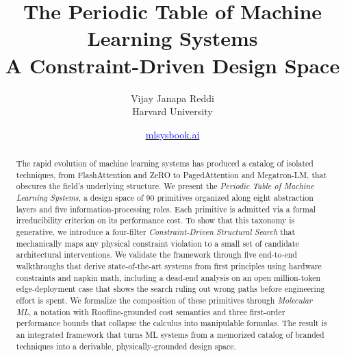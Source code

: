 \documentclass[10pt,twocolumn]{article}
\newcommand{\hrefurl}[2]{\href{#1}{\textcolor{blue}{#2}}}
\begin{document}
\title{
  \textbf{The Periodic Table of Machine Learning Systems}\\[0.3em]
  {\large A Constraint-Driven Design Space}
}

\author{
  Vijay Janapa Reddi\\
  Harvard University
}

\date{\hrefurl{https://mlsysbook.ai}{mlsysbook.ai}}

\maketitle
\begingroup
\renewcommand{\thefootnote}{}%
%
\endgroup

\begin{abstract}
The rapid evolution of machine learning systems has produced a catalog of isolated techniques, from FlashAttention and ZeRO to PagedAttention and Megatron-LM, that obscures the field's underlying structure. We present the \emph{Periodic Table of Machine Learning Systems}, a design space of 90 primitives organized along eight abstraction layers and five information-processing roles. Each primitive is admitted via a formal irreducibility criterion on its performance cost. To show that this taxonomy is generative, we introduce a four-filter \emph{Constraint-Driven Structural Search} that mechanically maps any physical constraint violation to a small set of candidate architectural interventions. We validate the framework through five end-to-end walkthroughs that derive state-of-the-art systems from first principles using hardware constraints and napkin math, including a dead-end analysis on an open million-token edge-deployment case that shows the search ruling out wrong paths before engineering effort is spent. We formalize the composition of these primitives through \emph{Molecular ML}, a notation with Roofline-grounded cost semantics and three first-order performance bounds that collapse the calculus into manipulable formulas. The result is an integrated framework that turns ML systems from a memorized catalog of branded techniques into a derivable, physically-grounded design space.
\end{abstract}
\end{document}
